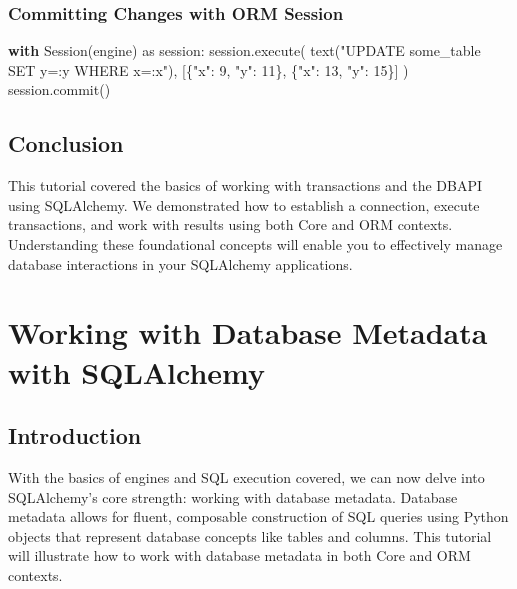 \documentclass[
  letterpaper,
  DIV=11,
  numbers=noendperiod]{scrreprt}
\newenvironment{Shaded}{\begin{snugshade}}{\end{snugshade}}
\newcommand{\ControlFlowTok}[1]{\textcolor[rgb]{0.00,0.23,0.31}{\textbf{#1}}}
\newcommand{\DecValTok}[1]{\textcolor[rgb]{0.68,0.00,0.00}{#1}}
\newcommand{\ImportTok}[1]{\textcolor[rgb]{0.00,0.46,0.62}{#1}}
\newcommand{\NormalTok}[1]{\textcolor[rgb]{0.00,0.23,0.31}{#1}}
\newcommand{\StringTok}[1]{\textcolor[rgb]{0.13,0.47,0.30}{#1}}
\begin{document}
\subsubsection{Committing Changes with ORM
Session}\label{committing-changes-with-orm-session}

\begin{Shaded}
\begin{Highlighting}[]
\ControlFlowTok{with}\NormalTok{ Session(engine) }\ImportTok{as}\NormalTok{ session:}
\NormalTok{    session.execute(}
\NormalTok{        text(}\StringTok{"UPDATE some\_table SET y=:y WHERE x=:x"}\NormalTok{),}
\NormalTok{        [\{}\StringTok{"x"}\NormalTok{: }\DecValTok{9}\NormalTok{, }\StringTok{"y"}\NormalTok{: }\DecValTok{11}\NormalTok{\}, \{}\StringTok{"x"}\NormalTok{: }\DecValTok{13}\NormalTok{, }\StringTok{"y"}\NormalTok{: }\DecValTok{15}\NormalTok{\}]}
\NormalTok{    )}
\NormalTok{    session.commit()}
\end{Highlighting}
\end{Shaded}

\subsection{Conclusion}\label{conclusion-17}

This tutorial covered the basics of working with transactions and the
DBAPI using SQLAlchemy. We demonstrated how to establish a connection,
execute transactions, and work with results using both Core and ORM
contexts. Understanding these foundational concepts will enable you to
effectively manage database interactions in your SQLAlchemy
applications.

\section{Working with Database Metadata with
SQLAlchemy}\label{working-with-database-metadata-with-sqlalchemy}

\subsection{Introduction}\label{introduction-2}

With the basics of engines and SQL execution covered, we can now delve
into SQLAlchemy's core strength: working with database metadata.
Database metadata allows for fluent, composable construction of SQL
queries using Python objects that represent database concepts like
tables and columns. This tutorial will illustrate how to work with
database metadata in both Core and ORM contexts.
\end{document}
